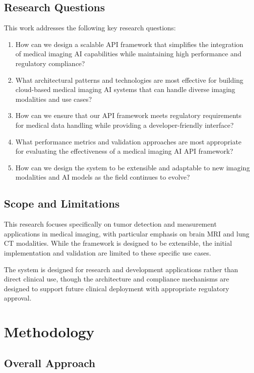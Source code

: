 \documentclass[12pt,a4paper]{article}
\begin{document}
\subsection{Research Questions}

This work addresses the following key research questions:

\begin{enumerate}
    \item How can we design a scalable API framework that simplifies the integration of medical imaging AI capabilities while maintaining high performance and regulatory compliance?
    \item What architectural patterns and technologies are most effective for building cloud-based medical imaging AI systems that can handle diverse imaging modalities and use cases?
    \item How can we ensure that our API framework meets regulatory requirements for medical data handling while providing a developer-friendly interface?
    \item What performance metrics and validation approaches are most appropriate for evaluating the effectiveness of a medical imaging AI API framework?
    \item How can we design the system to be extensible and adaptable to new imaging modalities and AI models as the field continues to evolve?
\end{enumerate}

\subsection{Scope and Limitations}

This research focuses specifically on tumor detection and measurement applications in medical imaging, with particular emphasis on brain MRI and lung CT modalities. While the framework is designed to be extensible, the initial implementation and validation are limited to these specific use cases.

The system is designed for research and development applications rather than direct clinical use, though the architecture and compliance mechanisms are designed to support future clinical deployment with appropriate regulatory approval.

\section{Methodology}

\subsection{Overall Approach}
\end{document}

